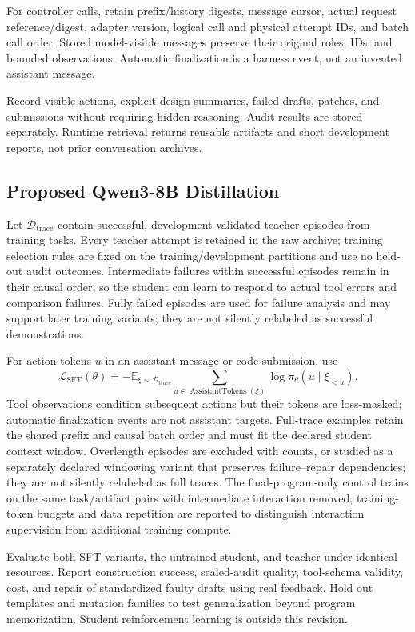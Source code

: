 For controller calls, retain prefix/history digests, message cursor, actual request reference/digest, adapter version, logical call and physical attempt IDs, and batch call order. Stored model-visible messages preserve their original roles, IDs, and bounded observations. Automatic finalization is a harness event, not an invented assistant message.

Record visible actions, explicit design summaries, failed drafts, patches, and submissions without requiring hidden reasoning. Audit results are stored separately. Runtime retrieval returns reusable artifacts and short development reports, not prior conversation archives.

\begin{samepage}
\subsection{Proposed Qwen3-8B Distillation}

Let $\mathcal D_{\mathrm{trace}}$ contain successful, development-validated teacher episodes from training tasks. Every teacher attempt is retained in the raw archive; training selection rules are fixed on the training/development partitions and use no held-out audit outcomes. Intermediate failures within successful episodes remain in their causal order, so the student can learn to respond to actual tool errors and comparison failures. Fully failed episodes are used for failure analysis and may support later training variants; they are not silently relabeled as successful demonstrations.\par
\end{samepage}

For action tokens $u$ in an assistant message or code submission, use
\begin{equation}
\mathcal L_{\mathrm{SFT}}(\theta)
 =-\mathbb E_{\xi\sim\mathcal D_{\mathrm{trace}}}
   \sum_{u\in\operatorname{AssistantTokens}(\xi)}
   \log\pi_\theta(u\mid\xi_{<u}).
\end{equation}
Tool observations condition subsequent actions but their tokens are loss-masked; automatic finalization events are not assistant targets. Full-trace examples retain the shared prefix and causal batch order and must fit the declared student context window. Overlength episodes are excluded with counts, or studied as a separately declared windowing variant that preserves failure--repair dependencies; they are not silently relabeled as full traces. The final-program-only control trains on the same task/artifact pairs with intermediate interaction removed; training-token budgets and data repetition are reported to distinguish interaction supervision from additional training compute.

Evaluate both SFT variants, the untrained student, and teacher under identical resources. Report construction success, sealed-audit quality, tool-schema validity, cost, and repair of standardized faulty drafts using real feedback. Hold out templates and mutation families to test generalization beyond program memorization. Student reinforcement learning is outside this revision.
